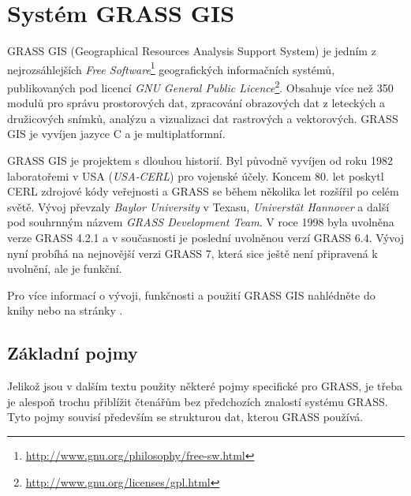 \documentclass[a4paper,12pt,draft]{article}
\begin{document}
\section{Systém GRASS GIS}
\label{sec:grass}
GRASS GIS (Geographical Resources Analysis Support System) je jedním z nejrozsáhlejších \emph{Free Software}\footnote{\url{http://www.gnu.org/philosophy/free-sw.html}} geografických informačních systémů, publikovaných pod licencí \emph{GNU General Public Licence}\footnote{\url{http://www.gnu.org/licenses/gpl.html}}. Obsahuje více než 350 modulů pro správu prostorových dat, zpracování obrazových dat z leteckých a družicových snímků, analýzu a vizualizaci dat rastrových a vektorových. GRASS GIS je vyvíjen jazyce C a je multiplatformní.

GRASS GIS je projektem s dlouhou historií. Byl původně vyvíjen od roku 1982 laboratořemi v USA (\emph{USA-CERL}) pro vojenské účely. Koncem 80. let poskytl CERL zdrojové kódy veřejnosti a GRASS se během několika let rozšířil po celém světě. Vývoj převzaly \emph{Baylor University} v Texasu, \emph{Universtät Hannover} a další pod souhrnným názvem \emph{GRASS Development Team}. V roce 1998 byla uvolněna verze GRASS 4.2.1 a v současnosti je poslední uvolněnou verzí GRASS 6.4. Vývoj nyní probíhá na nejnovější verzi GRASS 7, která sice ještě není připravená k uvolnění, ale je funkční. 

Pro více informací o vývoji, funkčnosti a použití GRASS GIS nahlédněte do knihy \cite{grass_gis} nebo na stránky \cite{grass_page}.

\subsection{Základní pojmy}
\label{sec:grass:pojmy}
Jelikož jsou v dalším textu použity některé pojmy specifické pro GRASS, je třeba je alespoň trochu přiblížit čtenářům bez předchozích znalostí systému GRASS. Tyto pojmy souvisí především se strukturou dat, kterou GRASS používá.
\end{document}
